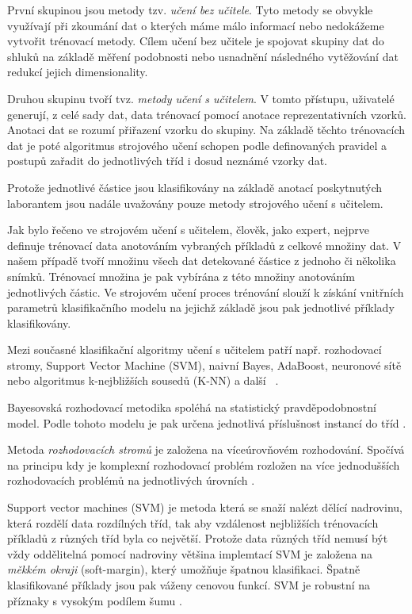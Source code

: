\documentclass[11pt,twoside,a4paper,table]{book}
\begin{document}
První skupinou jsou metody tzv. \textit{učení bez učitele}. Tyto metody se obvykle využívají při zkoumání dat o kterých máme málo informací nebo nedokážeme vytvořit trénovací metody. Cílem učení bez učitele je spojovat skupiny dat do shluků na základě měření podobnosti nebo usnadnění následného vytěžování dat redukcí jejich dimensionality.

Druhou skupinu tvoří tvz. \textit{metody učení s učitelem}. V tomto přístupu, uživatelé generují, z celé sady dat, data trénovací pomocí anotace reprezentativních vzorků. Anotaci dat se rozumí přiřazení vzorku do skupiny. Na základě těchto trénovacích dat je poté algoritmus strojového učení schopen podle definovaných pravidel a postupů zařadit do jednotlivých tříd i dosud neznámé vzorky dat.

Protože jednotlivé částice jsou klasifikovány na základě anotací poskytnutých laborantem jsou nadále uvažovány pouze metody strojového učení s učitelem.

Jak bylo řečeno ve strojovém učení s učitelem, člověk, jako expert, nejprve definuje trénovací data anotováním vybraných příkladů z celkové množiny dat. V našem případě tvoří množinu všech dat detekované částice z jednoho či několika snímků. Trénovací množina je pak vybírána z této množiny anotováním jednotlivých částic. Ve strojovém učení proces trénování slouží k získání vnitřních parametrů klasifikačního modelu na jejichž základě jsou pak jednotlivé příklady klasifikovány.

Mezi současné klasifikační algoritmy učení s učitelem patří např. rozhodovací stromy, Support Vector Machine (SVM), naivní Bayes, AdaBoost, neuronové sítě nebo algoritmus k-nejbližších sousedů (K-NN) a další ~\cite{book:pattern_class}.

Bayesovská rozhodovací metodika spoléhá na statistický pravděpodobnostní model. Podle tohoto modelu je pak určena jednotlivá příslušnost instancí do tříd \cite{art:neural_networks}.

Metoda \textit{rozhodovacích stromů} je založena na víceúrovňovém rozhodování. Spočívá na principu kdy je komplexní rozhodovací problém rozložen na více jednodušších rozhodovacích problémů na jednotlivých úrovních \cite{art:decision_trees}. 

Support vector machines (SVM) je metoda která se snaží nalézt dělící nadrovinu, která rozdělí data rozdílných tříd, tak aby vzdálenost nejbližších trénovacích příkladů z různých tříd byla co největší. Protože data různých tříd nemusí být vždy oddělitelná pomocí nadroviny většina implemtací SVM je založena na \textit{měkkém okraji} (soft-margin), který umožňuje špatnou klasifikaci. Špatně klasifikované příklady jsou pak váženy cenovou funkcí. SVM je robustní na příznaky s vysokým podílem šumu \cite{art:machine_in_cell}.
\end{document}
